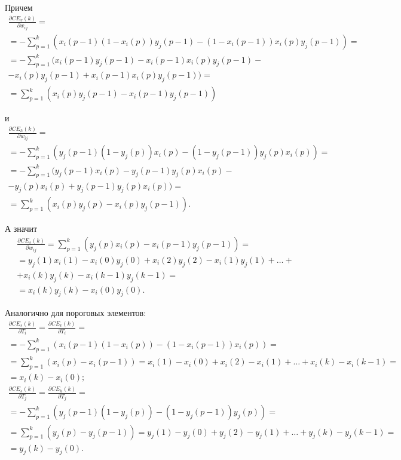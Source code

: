 Причем
\begin{multline*}
	\frac{\partial CE_v(k)}{\partial w_{ij}} = \\ = -\sum_{p=1}^k (x_i(p-1)(1-x_i(p))y_j(p-1)-(1-x_i(p-1))x_i(p)y_j(p-1))=\\=-\sum_{p=1}^k (x_i(p-1)y_j(p-1)-x_i(p-1)x_i(p)y_j(p-1)-\\-x_i(p)y_j(p-1)+x_i(p-1)x_i(p)y_j(p-1)) = \\ = \sum_{p=1}^{k} (x_i(p)y_j(p-1)-x_i(p-1)y_j(p-1))
\end{multline*}

и
\begin{multline*}
	\frac{\partial CE_h(k)}{\partial w_{ij}} = \\ = -\sum_{p=1}^k (y_j(p-1)(1-y_j(p))x_i(p)-(1-y_j(p-1))y_j(p)x_i(p)) = \\ = -\sum_{p=1}^{k} (y_j(p-1)x_i(p)-y_j(p-1)y_j(p)x_i(p)-\\-y_j(p)x_i(p)+y_j(p-1)y_j(p)x_i(p)) = \\ = \sum_{p=1}^{k} (x_i(p)y_j(p)-x_i(p)y_j(p-1)).
\end{multline*}

А значит
\begin{multline*}
	\frac{\partial CE_s(k)}{\partial w_{ij}} = \sum_{p=1}^{k}(y_j(p)x_i(p)-x_i(p-1)y_j(p-1)) = \\ = y_j(1)x_i(1)-x_i(0)y_j(0)+x_i(2)y_j(2)-x_i(1)y_j(1)+\dots+\\+x_i(k)y_j(k)-x_i(k-1)y_j(k-1)=\\=x_i(k)y_j(k)-x_i(0)y_j(0).
\end{multline*}

Аналогично для пороговых элементов:
\begin{multline*}
	\frac{\partial CE_s(k)}{\partial T_i} = \frac{\partial CE_v(k)}{\partial T_i} =\\= -\sum_{p=1}^k (x_i(p-1)(1-x_i(p))-(1-x_i(p-1))x_i(p)) =\\= \sum_{p=1}^k (x_i(p) - x_i(p-1)) = x_i(1)-x_i(0)+x_i(2) - x_i(1) +\dots+x_i(k)-x_i(k-1) =\\= x_i(k)-x_i(0);
\end{multline*}
\begin{multline*}
	\frac{\partial CE_s(k)}{\partial T_j} = \frac{\partial CE_h(k)}{\partial T_j} =\\= -\sum_{p=1}^k (y_j(p-1)(1-y_j(p))-(1-y_j(p-1))y_j(p)) =\\= \sum_{p=1}^k (y_j(p) - y_j(p-1)) = y_j(1)-y_j(0)+y_j(2) - y_j(1) +\dots+y_j(k)-y_j(k-1) =\\= y_j(k)-y_j(0).
\end{multline*}

